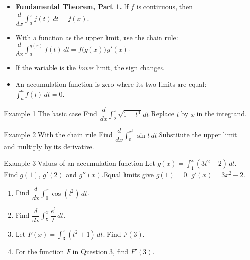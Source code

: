 \documentclass[11pt]{article}
\begin{document}

\begin{ideabox}
\begin{itemize}[leftmargin=*,itemsep=2pt,topsep=2pt]
  \item \textbf{Fundamental Theorem, Part 1.} If $f$ is continuous, then $\dfrac{d}{dx}\displaystyle\int_{a}^{x}f(t)\,dt=f(x)$.
  \item With a function as the upper limit, use the chain rule: $\dfrac{d}{dx}\displaystyle\int_{a}^{g(x)}f(t)\,dt=f\big(g(x)\big)\,g'(x)$.
  \item If the variable is the \emph{lower} limit, the sign changes.
  \item An accumulation function is zero where its two limits are equal: $\displaystyle\int_{a}^{a}f(t)\,dt=0$.
\end{itemize}
\end{ideabox}

\begin{example}{Example 1 \textperiodcentered{} The basic case}
Find $\dfrac{d}{dx}\displaystyle\int_{2}^{x}\sqrt{1+t^4}\,dt$.\soln Replace $t$ by $x$ in the integrand.
\end{example}

\begin{example}{Example 2 \textperiodcentered{} With the chain rule}
Find $\dfrac{d}{dx}\displaystyle\int_{0}^{x^3}\sin t\,dt$.\soln Substitute the upper limit and multiply by its derivative.
\end{example}

\begin{example}{Example 3 \textperiodcentered{} Values of an accumulation function}
Let $g(x)=\displaystyle\int_{1}^{x}\left(3t^2-2\right)\,dt$. Find $g(1)$, $g'(2)$ and $g''(x)$.\soln Equal limits give $g(1)=0$. $g'(x)=3x^2-2$.
\end{example}

\newpage
{}

\begin{enumerate}[leftmargin=*,itemsep=2pt]
  \item Find $\dfrac{d}{dx}\displaystyle\int_{0}^{x}\cos\!\left(t^2\right)\,dt$.\work{2.3cm}
  \item Find $\dfrac{d}{dx}\displaystyle\int_{5}^{x}\dfrac{e^{t}}{t}\,dt$.\work{2.3cm}
  \item Let $F(x)=\displaystyle\int_{3}^{x}\left(t^2+1\right)\,dt$. Find $F(3)$.\work{2.3cm}
  \item For the function $F$ in Question 3, find $F'(3)$.\work{2.3cm}
\end{enumerate}
\end{document}
